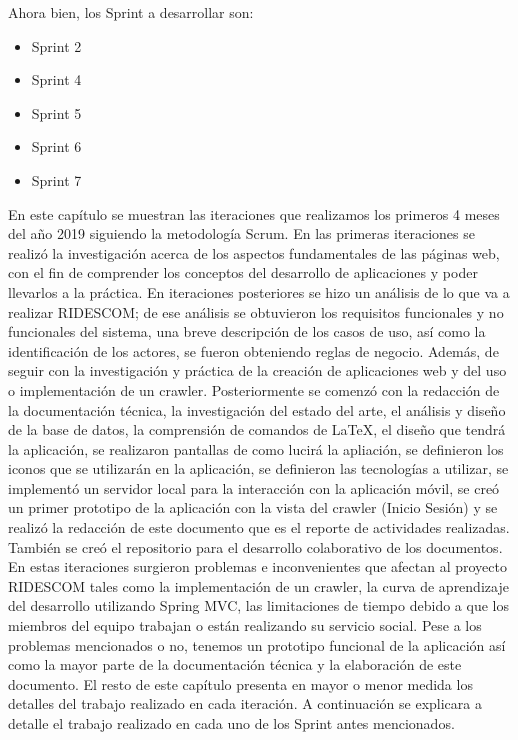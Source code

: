 	\noindent Ahora bien, los Sprint a desarrollar son: 
	\begin{itemize}
		\item Sprint 2
		\item Sprint 4
		\item Sprint 5
		\item Sprint 6
		\item Sprint 7
	\end{itemize}
	\noindent En este capítulo se muestran las iteraciones que realizamos los primeros 4 meses del año 2019 siguiendo la metodología Scrum. En las primeras iteraciones se realizó la investigación acerca de los aspectos fundamentales de las páginas web, con el fin de comprender los conceptos del desarrollo de aplicaciones y poder llevarlos a la práctica. En iteraciones posteriores se hizo un análisis de lo que va a realizar RIDESCOM; de ese análisis se obtuvieron los requisitos funcionales y no funcionales del sistema, una breve descripción de los casos de uso, así como la identificación de los actores, se fueron obteniendo reglas de negocio. Además, de seguir con la investigación y práctica de la creación de aplicaciones web y del uso o implementación de un crawler. Posteriormente se comenzó con la redacción de la documentación técnica, la investigación del estado del arte, el análisis y diseño de la base de datos, la comprensión de comandos de LaTeX, el diseño que tendrá la aplicación, se realizaron pantallas de como lucirá la apliación, se definieron los iconos que se utilizarán en la aplicación, se definieron las tecnologías a utilizar, se implementó un servidor local para la interacción con la aplicación móvil, se creó un primer prototipo de la aplicación con la vista del crawler (Inicio Sesión) y se realizó la redacción de este documento que es el reporte de actividades realizadas. También se creó el repositorio para el desarrollo colaborativo de los documentos. En estas iteraciones surgieron problemas e inconvenientes que afectan al proyecto RIDESCOM tales como la implementación de un crawler, la curva de aprendizaje del desarrollo utilizando Spring MVC, las limitaciones de tiempo debido a que los miembros del equipo trabajan o están realizando su servicio social. Pese a los problemas mencionados o no, tenemos un prototipo funcional de la aplicación así como la mayor parte de la documentación técnica y la elaboración de este documento. El resto de este capítulo presenta en mayor o menor medida los detalles del trabajo realizado en cada iteración. A continuación se explicara a detalle el trabajo realizado en cada uno de los Sprint antes mencionados.

